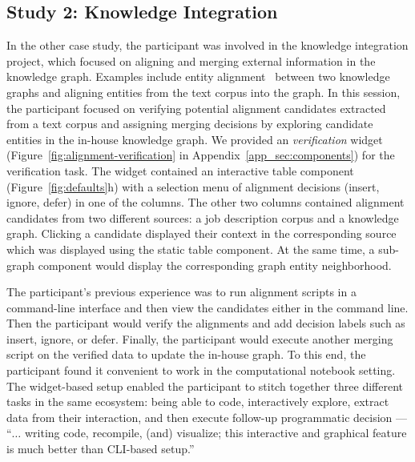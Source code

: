 \subsection{Study 2: Knowledge Integration}
In the other case study, the participant was involved in the knowledge integration project, which focused on aligning and merging external 
information in the knowledge graph. Examples include entity alignment~\cite{sun2020benchmarking} between two knowledge graphs and aligning entities from the text corpus into the graph. In this session, the participant focused on verifying potential alignment candidates extracted from a text corpus and assigning merging decisions by exploring candidate entities in the in-house knowledge graph. We provided an \emph{verification} widget (Figure~\ref{fig:alignment-verification} in Appendix~\ref{app_sec:components}) for the verification task. The widget contained an interactive table component (Figure~\ref{fig:defaults}h) with a selection menu of alignment decisions (\eg insert, ignore, defer) in one of the columns. The other two columns contained alignment candidates from two different sources: a job description corpus and a knowledge graph. Clicking a candidate displayed their context in the corresponding source which was displayed using the static table component. At the same time, a sub-graph component would display the corresponding graph entity neighborhood. 



 The participant's previous experience was to run alignment scripts in a command-line interface and then view the candidates either in the command line. Then the participant would verify the alignments and add decision labels such as insert, ignore, or defer. Finally, the participant would execute another merging script on the verified data to update the in-house graph. To this end, the participant found it convenient to work in the computational notebook setting. The widget-based setup enabled the participant to stitch together three different tasks in the same ecosystem: being able to code, interactively explore, extract data from their interaction, and then execute follow-up programmatic decision --- ``$\ldots$ writing code, recompile, (and) visualize; this interactive and graphical feature is much better than CLI-based setup.'' 

